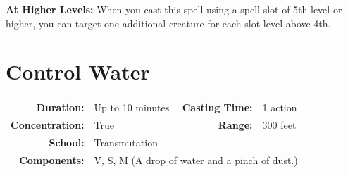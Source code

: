 \documentclass[12pt]{memoir}
\begin{document}
\vspace{8pt} \noindent\textbf{At Higher Levels:} When you cast this spell using a spell slot of 5th level or higher, you can target one additional creature for each slot level above 4th.
\newpage
\section*{Control Water}

{
\small\centering\vspace{-6pt}
\begin{tabular}{rlrl}
\toprule

\textbf{Duration:} & Up to 10 minutes &
\textbf{Casting Time:} & 1 action \\
\textbf{Concentration:} & True &
\textbf{Range:} & 300 feet \\
\textbf{School:} & Transmutation \\
\textbf{Components:} & \multicolumn{3}{p{0.7\textwidth}}{V, S, M (A drop of water and a pinch of dust.)}\\

\bottomrule
\end{tabular}
}
\end{document}
